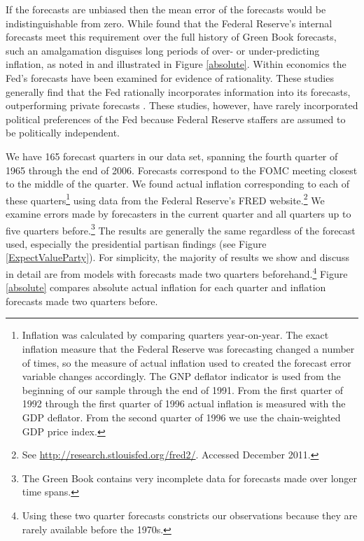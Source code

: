 \documentclass[a4paper]{article}\usepackage{graphicx, color}
\begin{document}
If the forecasts are unbiased then the mean error of the forecasts would be indistinguishable from zero. While \cite{Romer2000} found that the Federal Reserve's internal forecasts  meet this requirement over the full history of Green Book forecasts, such an amalgamation disguises long periods of over- or under-predicting inflation, as noted in \cite{Capistran2006} and illustrated in Figure \ref{absolute}. Within economics the Fed's forecasts have been examined for evidence of rationality. These studies generally find that the Fed rationally incorporates information into its forecasts, outperforming private forecasts \cite[c.f.][]{Gamber2009}. These studies, however, have rarely incorporated political preferences of the Fed because Federal Reserve staffers are assumed to be politically independent.

We have 165 forecast quarters in our data set, spanning the fourth quarter of 1965 through the end of 2006. Forecasts correspond to the FOMC meeting closest to the middle of the quarter. We found actual inflation corresponding to each of these quarters\footnote{Inflation was calculated by comparing quarters year-on-year. The exact inflation measure that the Federal Reserve was forecasting changed a number of times, so the measure of actual inflation used to created the forecast error variable changes accordingly. The GNP deflator indicator is used from the beginning of our sample through the end of 1991. From the first quarter of 1992 through the first quarter of 1996 actual inflation is measured with the GDP deflator.  From the second quarter of 1996 we use the chain-weighted GDP price index.} using data from the Federal Reserve's FRED website.\footnote{See \url{http://research.stlouisfed.org/fred2/}. Accessed December 2011.} We examine errors made by forecasters in the current quarter and all quarters up to five quarters before.\footnote{The Green Book contains very incomplete data for forecasts made over longer time spans.} The results are generally the same regardless of the forecast used, especially the presidential partisan findings (see Figure \ref{ExpectValueParty}). For simplicity, the majority of results we show and discuss in detail are from models with forecasts made two quarters beforehand.\footnote{Using these two quarter forecasts constricts our observations because they are rarely available before the 1970s.} Figure \ref{absolute} compares absolute actual inflation for each quarter and inflation forecasts made two quarters before.
\end{document}
